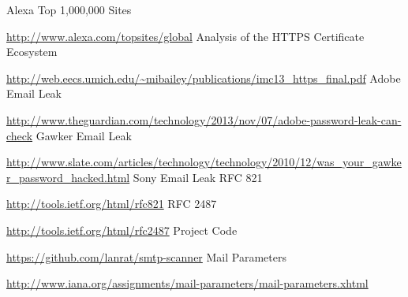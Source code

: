 \documentclass[11pt, twocolumn]{article}
\begin{document}
\begin{thebibliography}{1}
        Alexa Top 1,000,000 Sites

        \url{http://www.alexa.com/topsites/global}
        Analysis of the HTTPS Certiﬁcate Ecosystem

        \url{http://web.eecs.umich.edu/~mibailey/publications/imc13\_https\_final.pdf}
        Adobe Email Leak

        \url{http://www.theguardian.com/technology/2013/nov/07/adobe-password-leak-can-check}
        Gawker Email Leak

        \url{http://www.slate.com/articles/technology/technology/2010/12/was\_your\_gawker\_password\_hacked.html}
        Sony Email Leak
        RFC 821

        \url{http://tools.ietf.org/html/rfc821}
        RFC 2487

        \url{http://tools.ietf.org/html/rfc2487}
        Project Code

        \url{https://github.com/lanrat/smtp-scanner}
        Mail Parameters

        \url{http://www.iana.org/assignments/mail-parameters/mail-parameters.xhtml}
\end{thebibliography}
\end{document}
